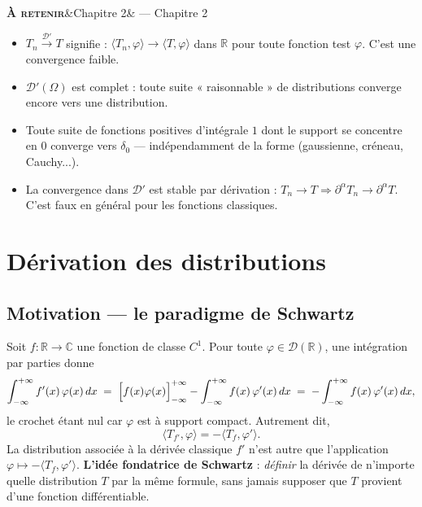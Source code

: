 \documentclass[12pt,a4paper,openany]{book}
\theoremstyle{definition}
\theoremstyle{plain}
\theoremstyle{remark}
\newenvironment{retenir}[1]{%
	\begin{mdframed}[linewidth=3pt, linecolor=black!70,
		topline=false, rightline=false, bottomline=false,
		backgroundcolor=shaderet,
		skipabove=14pt, skipbelow=14pt,
		innerleftmargin=14pt, innerrightmargin=8pt,
		innertopmargin=8pt, innerbottommargin=8pt]%
		\noindent\textbf{\scshape À retenir}\ifx&#1&\else{} — #1\fi\par\smallskip%
	}{%
	\end{mdframed}%
}
\begin{document}
	\begin{retenir}{Chapitre 2}
		\begin{itemize}
			\item $T_n \xrightarrow{\mathcal{D}'} T$ signifie : $\langle T_n, \varphi \rangle \to \langle T, \varphi \rangle$ dans $\mathbb{R}$ pour toute fonction test $\varphi$. C'est une convergence faible.
			\item $\mathcal{D}'(\Omega)$ est complet : toute suite « raisonnable » de distributions converge encore vers une distribution.
			\item Toute suite de fonctions positives d'intégrale $1$ dont le support se concentre en $0$ converge vers $\delta_0$ — indépendamment de la forme (gaussienne, créneau, Cauchy...).
			\item La convergence dans $\mathcal{D}'$ est stable par dérivation : $T_n \to T \Rightarrow \partial^\alpha T_n \to \partial^\alpha T$. C'est faux en général pour les fonctions classiques.
		\end{itemize}
	\end{retenir}
	
	\chapter{Dérivation des distributions}
	
	\section{Motivation — le paradigme de Schwartz}
	
	Soit $f : \mathbb{R} \to \mathbb{C}$ une fonction de classe $C^1$. Pour toute $\varphi \in \mathcal{D}(\mathbb{R})$, une intégration par parties donne
	\[
	\int_{-\infty}^{+\infty} f'(x)\,\varphi(x)\,dx
	\;=\;
	\Bigl[f(x)\varphi(x)\Bigr]_{-\infty}^{+\infty}
	- \int_{-\infty}^{+\infty} f(x)\,\varphi'(x)\,dx
	\;=\;
	-\int_{-\infty}^{+\infty} f(x)\,\varphi'(x)\,dx,
	\]
	le crochet étant nul car $\varphi$ est à support compact.  Autrement dit,
	\[
	\langle T_{f'}, \varphi \rangle = - \langle T_f, \varphi' \rangle.
	\]
	La distribution associée à la dérivée classique $f'$ n'est autre que l'application
	$\varphi \mapsto -\langle T_f, \varphi'\rangle$.
	\textbf{L'idée fondatrice de Schwartz} : \emph{définir} la dérivée de n'importe quelle distribution $T$ par la même formule, sans jamais supposer que $T$ provient d'une fonction différentiable.
	
\end{document}
